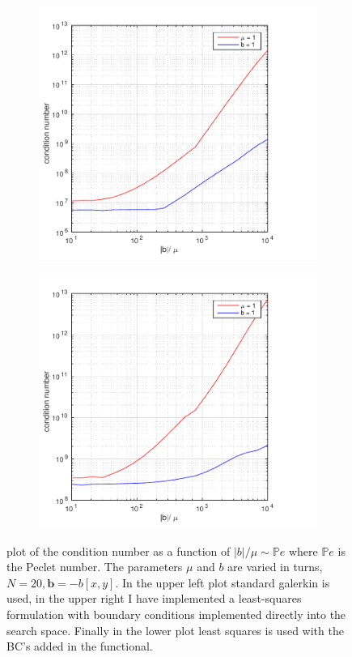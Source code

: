 \begin{figure}[h!]
\begin{subfigure}[b]{0.48\textwidth}
		\includegraphics[width=\textwidth]{Figures/Spec-LS_difftrans_ConditionNumber.pdf}
  \end{subfigure}
  \begin{subfigure}[b]{0.48\textwidth}
		\includegraphics[width=\textwidth]{Figures/Spec-LS_difftrans_ConditionNumber_DirFunc.pdf}
  \end{subfigure}
  \vspace{-0.1\baselineskip}
	\caption{plot of the condition number as a function of $|b|/\mu \sim \mathbb{P}e$ where $\mathbb{P}e$ is the Peclet number. The parameters $\mu$ and $b$ are varied in turns, $N=20,\mathbf{b} = -b[x,y]$. In the upper left plot standard galerkin is used, in the upper right I have implemented a least-squares formulation with boundary conditions implemented directly into the search space. Finally in the lower plot least squares is used with the BC's added in the functional.}
  \label{fig:CondDifftransSpec}
\end{figure}
